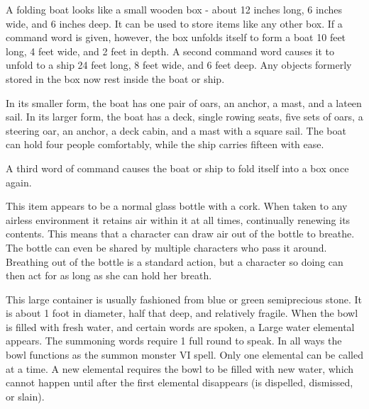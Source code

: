 {

 A folding boat looks like a small wooden box - about 12 inches long, 6 inches wide, and 6 inches deep. It can be used to store items like any other box. If a command word is given, however, the box unfolds itself to form a boat 10 feet long, 4 feet wide, and 2 feet in depth. A second command word causes it to unfold to a ship 24 feet long, 8 feet wide, and 6 feet deep. Any objects formerly stored in the box now rest inside the boat or ship.

In its smaller form, the boat has one pair of oars, an anchor, a mast, and a lateen sail. In its larger form, the boat has a deck, single rowing seats, five sets of oars, a steering oar, an anchor, a deck cabin, and a mast with a square sail. The boat can hold four people comfortably, while the ship carries fifteen with ease.

A third word of command causes the boat or ship to fold itself into a box once again.


 This item appears to be a normal glass bottle with a cork. When taken to any airless environment it retains air within it at all times, continually renewing its contents. This means that a character can draw air out of the bottle to breathe. The bottle can even be shared by multiple characters who pass it around. Breathing out of the bottle is a standard action, but a character so doing can then act for as long as she can hold her breath.


 This large container is usually fashioned from blue or green semiprecious stone. It is about 1 foot in diameter, half that deep, and relatively fragile. When the bowl is filled with fresh water, and certain words are spoken, a Large water elemental appears. The summoning words require 1 full round to speak. In all ways the bowl functions as the summon monster VI spell. Only one elemental can be called at a time. A new elemental requires the bowl to be filled with new water, which cannot happen until after the first elemental disappears (is dispelled, dismissed, or slain).

}
